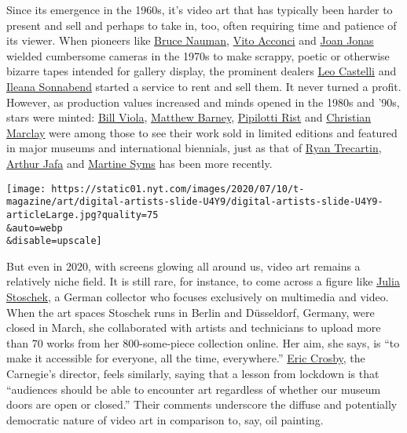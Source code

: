 Since its emergence in the 1960s, it's video art that has typically been
harder to present and sell and perhaps to take in, too, often requiring
time and patience of its viewer. When pioneers like
\href{https://www.nytimes.com/2018/10/15/t-magazine/bruce-nauman-art-interview.html}{Bruce
Nauman},
\href{https://www.nytimes.com/2017/04/28/arts/design/vito-acconci-dead-performance-artist.html}{Vito
Acconci} and
\href{https://www.nytimes.com/2015/04/05/t-magazine/joan-jonas-reanimation-venice-biennale.html}{Joan
Jonas} wielded cumbersome cameras in the 1970s to make scrappy, poetic
or otherwise bizarre tapes intended for gallery display, the prominent
dealers
\href{https://www.nytimes.com/1999/08/23/arts/leo-castelli-influential-art-dealer-dies-at-91.html}{Leo
Castelli} and
\href{https://www.nytimes.com/2007/10/24/arts/24sonnabend.html}{Ileana
Sonnabend} started a service to rent and sell them. It never turned a
profit. However, as production values increased and minds opened in the
1980s and '90s, stars were minted:
\href{https://www.nytimes.com/2017/03/14/t-magazine/art/bill-viola-palazzo-strozzi-florence.html}{Bill
Viola},
\href{https://www.nytimes.com/1999/10/10/magazine/the-importance-of-matthew-barney.html}{Matthew
Barney},
\href{https://www.nytimes.com/2016/10/22/arts/design/pipilotti-rist-provoking-with-delight.html}{Pipilotti
Rist} and
\href{https://www.nytimes.com/2018/11/19/arts/music/christian-marclay-huddersfield-music-festival.html}{Christian
Marclay} were among those to see their work sold in limited editions and
featured in major museums and international biennials, just as that of
\href{https://www.guggenheim.org/artwork/artist/ryan-trecartin}{Ryan
Trecartin},
\href{https://www.nytimes.com/2019/08/14/t-magazine/arthur-jafa-in-bloom.html}{Arthur
Jafa} and
\href{https://www.nytimes.com/2016/12/06/t-magazine/art/martine-syms-artist-poster-phrase.html}{Martine
Syms} has been more recently.

\texttt{[image: https://static01.nyt.com/images/2020/07/10/t-magazine/art/digital-artists-slide-U4Y9/digital-artists-slide-U4Y9-articleLarge.jpg?quality=75\\\&auto=webp\\\&disable=upscale]}

But even in 2020, with screens glowing all around us, video art remains
a relatively niche field. It is still rare, for instance, to come across
a figure like \href{https://www.jsc.art/}{Julia Stoschek}, a German
collector who focuses exclusively on multimedia and video. When the art
spaces Stoschek runs in Berlin and Düsseldorf, Germany, were closed in
March, she collaborated with artists and technicians to upload more than
70 works from her 800-some-piece collection online. Her aim, she says,
is ``to make it accessible for everyone, all the time, everywhere.''
\href{https://carnegiemuseums.org/expert/eric-crosby/}{Eric Crosby}, the
Carnegie's director, feels similarly, saying that a lesson from lockdown
is that ``audiences should be able to encounter art regardless of
whether our museum doors are open or closed.'' Their comments underscore
the diffuse and potentially democratic nature of video art in comparison
to, say, oil painting.

